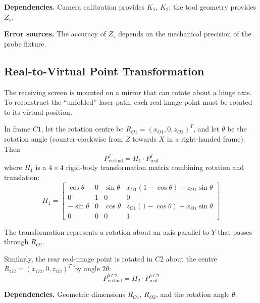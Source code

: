 \textbf{Dependencies.}
Camera calibration provides $K_1$, $K_2$;
the tool geometry provides $Z_s$.

\textbf{Error sources.}
The accuracy of $Z_s$ depends on the mechanical precision
of the probe fixture.


\subsection{Real-to-Virtual Point Transformation}
\label{sec:real2virtual}

The receiving screen is mounted on a mirror that can rotate
about a hinge axis.
%
To reconstruct the ``unfolded'' laser path,
each real image point must be rotated to its virtual position.

In frame $C1$, let the rotation centre be
$R_{O1} = (x_{O1}, 0, z_{O1})^T$,
and let $\theta$ be the rotation angle
(counter-clockwise from $Z$ towards $X$ in a right-handed
frame).
%
Then
%
\begin{equation}
  \boxed{P^f_{\mathrm{virtual}} = H_1 \cdot P^f_{\mathrm{real}}}
  \label{eq:H1}
\end{equation}
%
where $H_1$ is a $4\times4$ rigid-body transformation matrix
combining rotation and translation:
%
\begin{equation}
  H_1 =
  \begin{bmatrix}
    \cos\theta  & 0 & \sin\theta
      & x_{O1}(1{-}\cos\theta) - z_{O1}\sin\theta \\
    0           & 1 & 0           & 0 \\
    -\sin\theta & 0 & \cos\theta
      & z_{O1}(1{-}\cos\theta) + x_{O1}\sin\theta \\
    0           & 0 & 0           & 1
  \end{bmatrix}
  \label{eq:H1-matrix}
\end{equation}

The transformation represents a rotation about an axis
parallel to $Y$ that passes through $R_{O1}$.

Similarly, the rear real-image point is rotated in $C2$
about the centre $R_{O2} = (x_{O2}, 0, z_{O2})^T$
by angle $2\theta$:
%
\begin{equation}
  P^{b\text{-}C2}_{\mathrm{virtual}}
    = H_2 \cdot P^{b\text{-}C2}_{\mathrm{real}}
  \label{eq:H2}
\end{equation}

\textbf{Dependencies.}
Geometric dimensions $R_{O1}$, $R_{O2}$, and the
rotation angle $\theta$.

